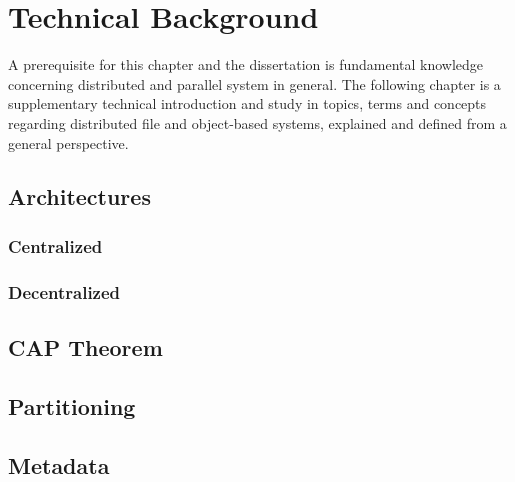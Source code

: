 \chapter{Technical Background}
A prerequisite for this chapter and the dissertation is fundamental knowledge concerning distributed and parallel system in general. The following chapter is a supplementary technical introduction and study in topics, terms and concepts regarding distributed file and object-based systems, explained and defined from a general perspective.

\section{Architectures} \label{sec:architectures}

\subsection*{Centralized}

\subsection*{Decentralized}

\section{CAP Theorem} \label{sec:cap}

\section{Partitioning} \label{sec:partitioning}

\section{Metadata} \label{sec:metadata}
